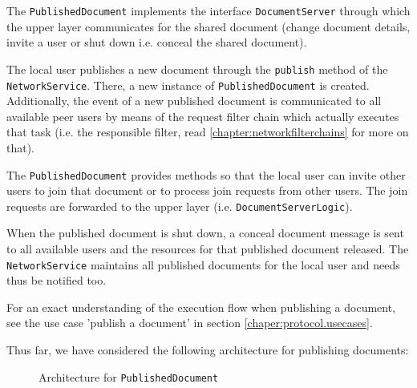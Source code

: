 The \texttt{PublishedDocument} implements the interface \texttt{DocumentServer} through which the upper layer communicates for the shared document (change document details, invite a user or shut down i.e. conceal the shared document).

The local user publishes a new document through the \texttt{publish} method of the \texttt{NetworkService}. There, a new instance of \texttt{PublishedDocument} is created. Additionally, the event of a new published document is communicated to all available peer users by means of the request filter chain which actually executes that task (i.e. the responsible filter, read \ref{chapter:networkfilterchains} for more on that).

The \texttt{PublishedDocument} provides methods so that the local user can invite other users to join that document or to process join requests from other users. The join requests are forwarded to the upper layer (i.e. \texttt{DocumentServerLogic}). 

When the published document is shut down, a conceal document message is sent to all available users and the resources for that published document released. The \texttt{NetworkService} maintains all published documents for the local user and needs thus be notified too.

For an exact understanding of the execution flow when publishing a document, see the use case 'publish a document' in section \ref{chaper:protocol.usecases}.

Thus far, we have considered the following architecture for publishing documents:
\begin{figure}[H]
 \centering
 \caption{Architecture for \texttt{PublishedDocument}}
 \label{fig:network.protocol.architecture1.uml}
\end{figure}


